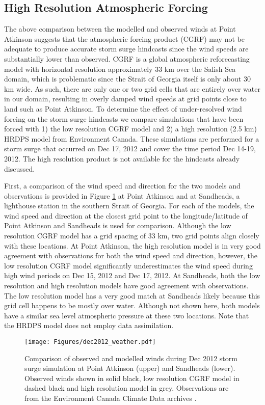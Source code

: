 \documentclass{tATO2e}
\begin{document}
\subsection{High Resolution Atmospheric Forcing}\label{sec:res}
The above comparison between the modelled and observed winds at Point Atkinson suggests that the atmospheric forcing product (CGRF) may not be adequate to produce accurate storm surge hindcasts since the wind speeds are substantially lower than observed. CGRF is a global atmospheric reforecasting model with horizontal resolution approximately 33 km over the Salish Sea domain, which is problematic since the Strait of Georgia itself is only about 30 km wide. As such, there are only one or two grid cells that are entirely over water in our domain, resulting in overly damped wind speeds at grid points close to land such as Point Atkinson. To determine the effect of under-resolved wind forcing on the storm surge hindcasts we compare simulations that have been forced with 1) the low resolution CGRF model and 2) a high resolution (2.5 km) HRDPS model from Environment Canada.  These simulations are performed for a storm surge that occurred on Dec 17, 2012 and cover the time period Dec 14-19, 2012. The high resolution product is not available for the hindcasts already discussed. 

First, a comparison of the wind speed and direction for the two models and observations is provided in Figure \ref{fig:dec2012_weather} at Point Atkinson and at Sandheads, a lighthouse station in the southern Strait of Georgia. For each of the models, the wind speed and direction at the closest grid point to the longitude/latitude of Point Atkinson and Sandheads is used for comparison. Although the low resolution CGRF model has a grid spacing of 33 km, two grid points align closely with these locations. At Point Atkinson, the high resolution model is in very good agreement with observations for both the wind speed and direction, however, the low resolution CGRF model significantly underestimates the wind speed during high wind periods on Dec 15, 2012 and Dec 17, 2012. At Sandheads, both the low resolution and high resolution models have good agreement with observations. The low resolution model has a very good match at Sandheads likely because this grid cell happens to be mostly over water. Although not shown here, both models have a similar sea level atmospheric pressure at these two locations. Note that the HRDPS model does not employ data assimilation.

\begin{figure}
\centering
\texttt{[image: Figures/dec2012\_weather.pdf]}
\caption{Comparison of observed and modelled winds during Dec 2012 storm surge simulation at Point Atkinson (upper) and Sandheads (lower). Observed winds shown in solid black, low resolution CGRF model in dashed black and high resolution model in grey. Observations are from the Environment Canada Climate Data archives \citep{ECClimateArchive}.}
\label{fig:dec2012_weather}
\end{figure}
\end{document}
